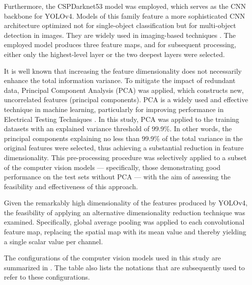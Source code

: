 \documentclass[10pt]{iopart}
\begin{document}
Furthermore, the CSPDarknet53 model was employed,
which serves as the CNN backbone for YOLOv4.
Models of this family feature a more sophisticated CNN architecture optimized not for single-object classification
but for multi-object detection in images.
They are widely used in imaging-based techniques \cite{Liu2024a, Li2024a, Chen2022}.
The employed model produces three feature maps, and for subsequent processing, either only the highest-level layer or the two deepest layers were selected.

It is well known that increasing the feature dimensionality does not necessarily enhance the total information variance.
To mitigate the impact of redundant data, Principal Component Analysis (PCA) was applied, which constructs new, uncorrelated features (principal components).
PCA is a widely used and effective technique in machine learning, particularly for improving performance in Electrical Testing Techniques \cite{Fadhel2019, Gao2020}.
In this study, PCA was applied to the training datasets with an explained variance threshold of 99.9\%.
In other words, the principal components explaining no less than 99.9\% of the total variance in the original features were selected,
thus achieving a substantial reduction in feature dimensionality.
This pre-processing procedure was selectively applied to a subset of the computer vision models ---
specifically, those demonstrating good performance on the test sets without PCA --- with the aim of assessing the feasibility and effectiveness of this approach.

Given the remarkably high dimensionality of the features produced by YOLOv4,
the feasibility of applying an alternative dimensionality reduction technique was examined.
Specifically, global average pooling was applied to each convolutional feature map,
replacing the spatial map with its mean value and thereby yielding a single scalar value per channel.

The configurations of the computer vision models used in this study are summarized in .
The table also lists the notations that are subsequently used to refer to these configurations.
\end{document}
